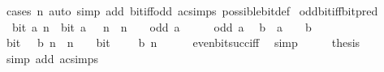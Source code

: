 \begin{isabellebody}
\ {\isacharparenleft}{\kern0pt}cases\ n{\isacharcomma}{\kern0pt}\ auto\ simp\ add{\isacharcolon}{\kern0pt}\ bit{\isacharunderscore}{\kern0pt}iff{\isacharunderscore}{\kern0pt}odd\ ac{\isacharunderscore}{\kern0pt}simps\ possible{\isacharunderscore}{\kern0pt}bit{\isacharunderscore}{\kern0pt}def{\isacharparenright}{\kern0pt}%
\endisatagproof
{\isafoldproof}%
%
\isadelimproof
\isanewline
%
\endisadelimproof
\isanewline
{}\isamarkupfalse%
\ odd{\isacharunderscore}{\kern0pt}bit{\isacharunderscore}{\kern0pt}iff{\isacharunderscore}{\kern0pt}bit{\isacharunderscore}{\kern0pt}pred{\isacharcolon}{\kern0pt}\isanewline
\ \ {\isacartoucheopen}bit\ a\ n\ {\isasymlongleftrightarrow}\ bit\ {\isacharparenleft}{\kern0pt}a\ {\isacharminus}{\kern0pt}\ {}{\isacharparenright}{\kern0pt}\ n\ {\isasymor}\ n\ {\isacharequal}{\kern0pt}\ {}{\isacartoucheclose}\ \ {\isacartoucheopen}odd\ a{\isacartoucheclose}\isanewline
%
\isadelimproof
%
\endisadelimproof
%
\isatagproof
{}\isamarkupfalse%
\ {\isacharminus}{\kern0pt}\isanewline
\ \ \isamarkupfalse%
\ {\isacartoucheopen}odd\ a{\isacartoucheclose}\ \isamarkupfalse%
\ b\ \ {\isacartoucheopen}a\ {\isacharequal}{\kern0pt}\ {}\ {\isacharasterisk}{\kern0pt}\ b\ {\isacharplus}{\kern0pt}\ {}{\isacartoucheclose}\ \isacommand{{\isachardot}{\kern0pt}{\isachardot}{\kern0pt}}\isamarkupfalse%
\isanewline
\ \ \isamarkupfalse%
\ \isamarkupfalse%
\ {\isacartoucheopen}bit\ {\isacharparenleft}{\kern0pt}{}\ {\isacharasterisk}{\kern0pt}\ b{\isacharparenright}{\kern0pt}\ n\ {\isasymor}\ n\ {\isacharequal}{\kern0pt}\ {}\ {\isasymlongleftrightarrow}\ bit\ {\isacharparenleft}{\kern0pt}{}\ {\isacharplus}{\kern0pt}\ {}\ {\isacharasterisk}{\kern0pt}\ b{\isacharparenright}{\kern0pt}\ n{\isacartoucheclose}\isanewline
\ \ \ \ \isamarkupfalse%
\ even{\isacharunderscore}{\kern0pt}bit{\isacharunderscore}{\kern0pt}succ{\isacharunderscore}{\kern0pt}iff\ \isamarkupfalse%
\ simp\isanewline
\ \ \isamarkupfalse%
\ \isamarkupfalse%
\ {\isacharquery}{\kern0pt}thesis\ \isamarkupfalse%
\ {\isacharparenleft}{\kern0pt}simp\ add{\isacharcolon}{\kern0pt}\ ac{\isacharunderscore}{\kern0pt}simps{\isacharparenright}{\kern0pt}\isanewline
{}\isamarkupfalse%
%
\endisatagproof
{\isafoldproof}%
%
\isadelimproof
\isanewline
%
\endisadelimproof
\isanewline
{}\isamarkupfalse%

\end{isabellebody}
